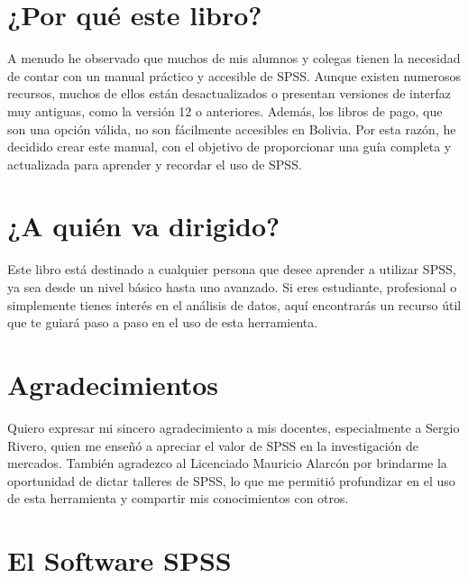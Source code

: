 \documentclass[
  letterpaper,
  DIV=11,
  numbers=noendperiod]{scrreprt}
\begin{document}
\section*{¿Por qué este libro?}\label{por-quuxe9-este-libro}


A menudo he observado que muchos de mis alumnos y colegas tienen la
necesidad de contar con un manual práctico y accesible de SPSS. Aunque
existen numerosos recursos, muchos de ellos están desactualizados o
presentan versiones de interfaz muy antiguas, como la versión 12 o
anteriores. Además, los libros de pago, que son una opción válida, no
son fácilmente accesibles en Bolivia. Por esta razón, he decidido crear
este manual, con el objetivo de proporcionar una guía completa y
actualizada para aprender y recordar el uso de SPSS.

\section*{¿A quién va dirigido?}\label{a-quiuxe9n-va-dirigido}


Este libro está destinado a cualquier persona que desee aprender a
utilizar SPSS, ya sea desde un nivel básico hasta uno avanzado. Si eres
estudiante, profesional o simplemente tienes interés en el análisis de
datos, aquí encontrarás un recurso útil que te guiará paso a paso en el
uso de esta herramienta.

\section*{Agradecimientos}\label{agradecimientos}


Quiero expresar mi sincero agradecimiento a mis docentes, especialmente
a Sergio Rivero, quien me enseñó a apreciar el valor de SPSS en la
investigación de mercados. También agradezco al Licenciado Mauricio
Alarcón por brindarme la oportunidad de dictar talleres de SPSS, lo que
me permitió profundizar en el uso de esta herramienta y compartir mis
conocimientos con otros.

\section*{El Software SPSS}\label{el-software-spss}
\end{document}
